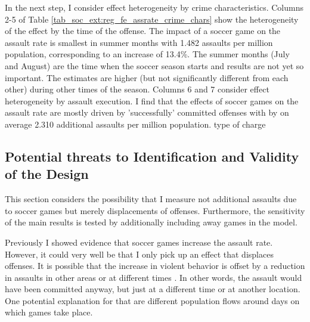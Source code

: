 \documentclass[11pt, a4paper]{article} %
\begin{document}
In the next step, I consider effect heterogeneity by crime characteristics. Columns 2-5 of Table \ref{tab_soc_ext:reg_fe_assrate_crime_chars} show the heterogeneity of the effect by the time of the offense. The impact of a soccer game on the assault rate is smallest in summer months with 1.482 assaults per million population, corresponding to an increase of 13.4\%. The summer months (July and August) are the time when the soccer season starts and results are not yet so important. The estimates are higher (but not significantly different from each other) during other times of the season. Columns 6 and 7 consider effect heterogeneity by assault execution. I find that the effects of soccer games on the assault rate are mostly driven by 'successfully' committed offenses with by on average 2.310 additional assaults per million population.
{\color{red} type of charge}



\subsection{Potential threats to Identification and Validity of the Design}
 This section considers the possibility that I measure not additional assaults due to soccer games but merely displacements of offenses. Furthermore, the sensitivity of the main results is tested by additionally including away games in the model.

Previously I showed evidence that soccer games increase the assault rate. However, it could very well be that I only pick up an effect that displaces offenses. It is possible that the increase in violent behavior is offset by a reduction in assaults in other areas or at different times \citep{lindo2018college}. In other words, the assault would have been committed anyway, but just at a different time or at another location. One potential explanation for that are different population flows around days on which games take place.
\end{document}

